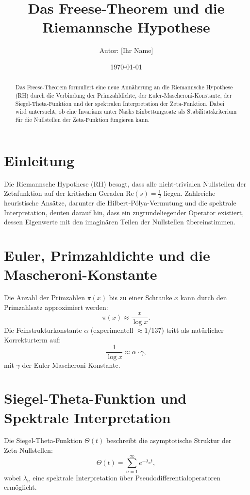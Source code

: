 \documentclass[a4paper,12pt]{article}
\title{Das Freese-Theorem und die Riemannsche Hypothese}
\author{Autor: [Ihr Name]}
\date{\today}
\begin{document}
\maketitle

\begin{abstract}
Das Freese-Theorem formuliert eine neue Annäherung an die Riemannsche Hypothese (RH) durch die Verbindung der Primzahldichte, der Euler-Mascheroni-Konstante, der Siegel-Theta-Funktion und der spektralen Interpretation der Zeta-Funktion. Dabei wird untersucht, ob eine Invarianz unter Nashs Einbettungssatz als Stabilitätskriterium für die Nullstellen der Zeta-Funktion fungieren kann.
\end{abstract}

\section{Einleitung}
Die Riemannsche Hypothese (RH) besagt, dass alle nicht-trivialen Nullstellen der Zetafunktion auf der kritischen Geraden $\text{Re}(s) = \frac{1}{2}$ liegen. Zahlreiche heuristische Ansätze, darunter die Hilbert-Pólya-Vermutung und die spektrale Interpretation, deuten darauf hin, dass ein zugrundeliegender Operator existiert, dessen Eigenwerte mit den imaginären Teilen der Nullstellen übereinstimmen.

\section{Euler, Primzahldichte und die Mascheroni-Konstante}
Die Anzahl der Primzahlen $\pi(x)$ bis zu einer Schranke $x$ kann durch den Primzahlsatz approximiert werden:
\begin{equation}
\pi(x) \approx \frac{x}{\log x}.
\end{equation}
Die Feinstrukturkonstante $\alpha$ (experimentell $\approx 1/137$) tritt als natürlicher Korrekturterm auf:
\begin{equation}
\frac{1}{\log x} \approx \alpha \cdot \gamma,
\end{equation}
mit $\gamma$ der Euler-Mascheroni-Konstante.

\section{Siegel-Theta-Funktion und Spektrale Interpretation}
Die Siegel-Theta-Funktion $\Theta(t)$ beschreibt die asymptotische Struktur der Zeta-Nullstellen:
\begin{equation}
\Theta(t) = \sum_{n=1}^{\infty} e^{-\lambda_n t},
\end{equation}
wobei $\lambda_n$ eine spektrale Interpretation über Pseudodifferentialoperatoren ermöglicht.
\end{document}
